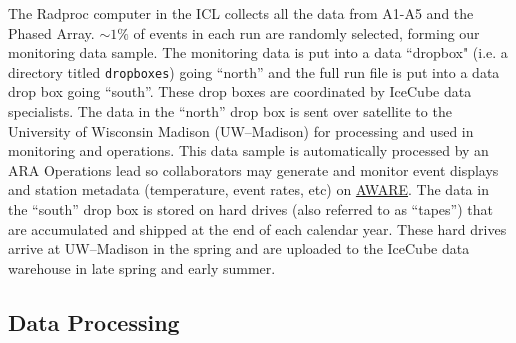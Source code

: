         The Radproc computer in the ICL collects all the data from A1-A5 and the Phased Array.
        $\sim \! 1\%$ of events in each run are randomly selected, forming our monitoring data sample. 
        The monitoring data is put into a data ``dropbox" (i.e. a directory titled \texttt{dropboxes}) going ``north'' and the full run file is put into a data drop box going ``south''. 
        These drop boxes are coordinated by IceCube data specialists. 
        The data in the ``north'' drop box is sent over satellite to the University of Wisconsin Madison (UW--Madison) for processing and used in monitoring and operations. 
        This data sample is automatically processed by an ARA Operations lead so collaborators may generate and monitor event displays and station metadata (temperature, event rates, etc) on \href{http://aware.wipac.wisc.edu}{AWARE}.
        The data in the ``south'' drop box is stored on hard drives (also referred to as ``tapes'') that are accumulated and shipped at the end of each calendar year. 
        These hard drives arrive at UW--Madison in the spring and are uploaded to the IceCube data warehouse in late spring and early summer.
  
    \subsection{Data Processing}
  
